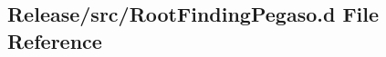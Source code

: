 \hypertarget{RootFindingPegaso_8d}{
\subsection{Release/src/RootFindingPegaso.d File Reference}
\label{RootFindingPegaso_8d}
}
